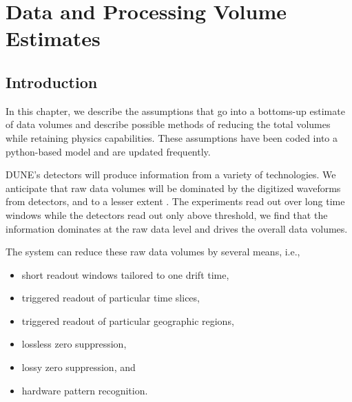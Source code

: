 \documentclass[../main-v1.tex]{subfiles}
\begin{document}
\chapter{Data and Processing Volume Estimates }
\label{ch:est}
 


\section{Introduction }%

In this chapter, we describe the assumptions that go into a bottoms-up estimate of data volumes and describe possible methods of reducing the total volumes while retaining physics capabilities. 
These assumptions have been coded into a python-based model and are updated frequently. 



DUNE's detectors will produce information from a variety of technologies.  We anticipate that raw data volumes will be dominated by the digitized waveforms from  detectors, and to a lesser extent . The  experiments read out over long time windows while the  detectors read out only above threshold, we find that the  information dominates at the raw data level and drives the overall data volumes. %

The  system can reduce these raw data volumes by several means, i.e.,
\begin{itemize} 
\item short readout windows tailored to one drift time,
\item triggered readout of particular time slices,
\item triggered readout of particular geographic regions,
\item lossless zero suppression,
\item lossy zero suppression, and
\item hardware pattern recognition.
\end{itemize}
\end{document}

